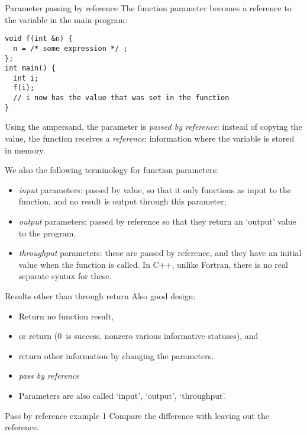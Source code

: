 \begin{block}{Parameter passing by reference}
  \label{sl:pass-by-ref}
The function parameter  becomes a reference to the variable 
in the main program:
\begin{verbatim}
void f(int &n) {
  n = /* some expression */ ;
};
int main() {
  int i;
  f(i);
  // i now has the value that was set in the function
}
\end{verbatim}
\end{block}

Using the ampersand, the parameter is
\emph{passed by reference}:
instead of copying the value, the function receives a \emph{reference}:
information where the variable is stored in memory.

We also the following terminology for function parameters:
\begin{itemize}
\item \emph{input} parameters: passed by
  value, so that it only functions as input to the function, and no
  result is output through this parameter;
\item \emph{output} parameters: passed
  by reference so that they return an `output' value to the program.
\item \emph{throughput} parameters:
  these are passed by reference, and they have an initial value when
  the function is called. In C++, unlike Fortran, there is no real
  separate syntax for these.
\end{itemize}

\begin{slide}{Results other than through return}
  \label{sl:func-err-return}
  Also good design:
  \begin{itemize}
  \item Return no function result,
  \item or return  (0~is success, nonzero various
    informative statuses), and
  \item return other information by changing the parameters.
  \item \emph{pass by reference}
  \item Parameters are also called `input', `output', `throughput'.
  \end{itemize}
\end{slide}

\begin{block}{Pass by reference example 1}
  \label{sl:pass-reference1}
  Compare the difference with leaving out the reference.
\end{block}

